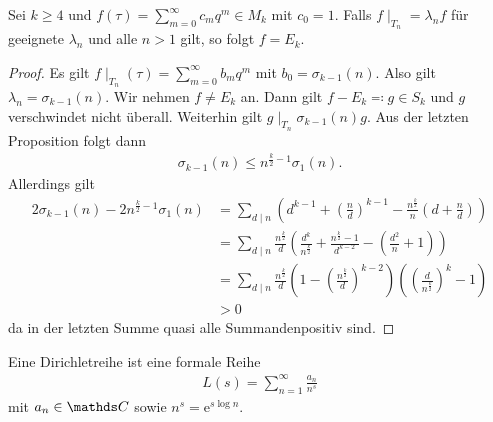 \begin{prop}
Sei $k\geq 4$ und $f(\tau)=\sum_{m=0}^\infty c_mq^m\in M_k$ mit $c_0=1$.
Falls $f\mid_{T_n}=\lambda_n f$ für geeignete $\lambda_n$ und alle $n>1$ gilt, so folgt $f=E_k$.
\end{prop}
\begin{proof}
Es gilt $f\mid_{T_n}(\tau)=\sum_{m=0}^\infty b_mq^m$ mit $b_0=\sigma_{k-1}(n)$.
Also gilt $\lambda_n=\sigma_{k-1}(n)$.
Wir nehmen $f\not =E_k$ an.
Dann gilt $f-E_k \eqqcolon g \in S_k$ und $g$ verschwindet nicht überall.
Weiterhin gilt $g\mid_{T_n} \sigma_{k-1}(n)g$.
Aus der letzten Proposition folgt dann
\begin{align*}
\sigma_{k-1}(n)\leq n^{\frac{k}{2}-1 }\sigma_1(n).
\end{align*}
Allerdings gilt
\begin{align*}
2\sigma_{k-1}(n)-2n^{\frac{k}{2}-1} \sigma_1(n)&=\sum_{d\mid n}  \left(d^{k-1}+\left(\frac{n}{d}\right)^{k-1}-\frac{n^{\frac{k}{2}}}{n}(d+\frac{n}{d})\right)\\
&=\sum_{d \mid n} \frac{n^{\frac{k}{2}}}{d}\left(\frac{d^k}{n^{\frac{k}{2}}}+\frac{n^{\frac{k}{2}}-1}{d^{k-2}}-\left(\frac{d^2}{n}+1\right) \right)\\
&=\sum_{d \mid n} \frac{n^{\frac{k}{2}}}{d} \left(1-\left(\frac{n^{\frac{k}{2}}}{d}\right)^{k-2}\right) \left(\left(\frac{d}{n^{\frac{k}{2}}}\right)^k-1\right)\\
&>0
\end{align*}
da in der letzten Summe \glqq quasi alle Summanden\grqq positiv sind.

\end{proof}

Eine Dirichletreihe ist eine formale Reihe
\begin{align*}
L(s)=\sum_{n=1}^\infty \frac{a_n}{n^s}
\end{align*}
mit $a_n\in \C$ sowie $n^s=\mathrm{e}^{s \log n}$.

